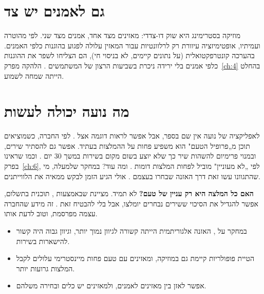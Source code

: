\section{גם לאמנים יש צד}

מוזיקה בסטרימינג היא שוק דו-צדדי: מאזינים מצד אחד, אמנים מצד שני. לפי מהוטרה ועמיתיו, אופטימיזציה עיוורת רק לרלוונטיות עבור המאזין עלולה לפגוע בהוגנות כלפי האמנים. בהערכה קונטרפקטואלית (על נתונים קיימים, לא בניסוי חי), הם הצליחו לשפר את ההוגנות כלפי אמנים בלי ירידה ניכרת בשביעות הרצון של המשתמשים \cite{mehrotra2018towards}. הלהקה מפרק~\ref{ch:4} בהחלט הייתה שמחה לשמוע.

\section{מה נועה יכולה לעשות}

לאפליקציה של נועה אין שם בספר, אבל אפשר לראות דוגמה אצל . לפי החברה, כשמוציאים תוכן מ„פרופיל הטעם" הוא משפיע פחות על ההמלצות בעתיד. אפשר גם להסתיר שירים, ובמנוי פרימיום להשהות שיר כך שלא יוצע בשום מקום בשירות במשך 30 יום \cite{spotify2026understanding}. וכמו שראינו בפרק~\ref{ch:6}, לפי  „לא מעוניין" מוביל לפחות המלצות דומות \cite{spotify2026understanding}. ומה עוד? במחקר שלמעלה, מי שהתגוונו עשו זאת דרך האזנה שבחרו בעצמם \cite{anderson2020algorithmic}. אולי הגיע הזמן לבקש ממאיה את הלווייתנים.

\begin{realitycheck}
\textbf{האם כל המלצה היא רק עניין של טעם?} לא תמיד.  מציינת שבאמצעות , תוכנית בתשלום, אפשר להגדיל את הסיכוי ששירים נבחרים יומלצו, אבל בלי להבטיח זאת \cite{spotify2026understanding}. זה מידע שהחברה עצמה מפרסמת, וטוב לדעת אותו.
\end{realitycheck}

\begin{inshort}
\begin{itemize}
  \item במחקר על , האזנה אלגוריתמית הייתה קשורה לגיוון נמוך יותר, וגיוון גבוה היה קשור להישארות בשירות.
  \item הטיית פופולריות קיימת גם במוזיקה, ומאזינים עם טעם פחות מיינסטרימי עלולים לקבל המלצות גרועות יותר.
  \item אפשר לאזן בין מאזינים לאמנים, ולמאזינים יש כלים ובחירה משלהם.
\end{itemize}
\end{inshort}
